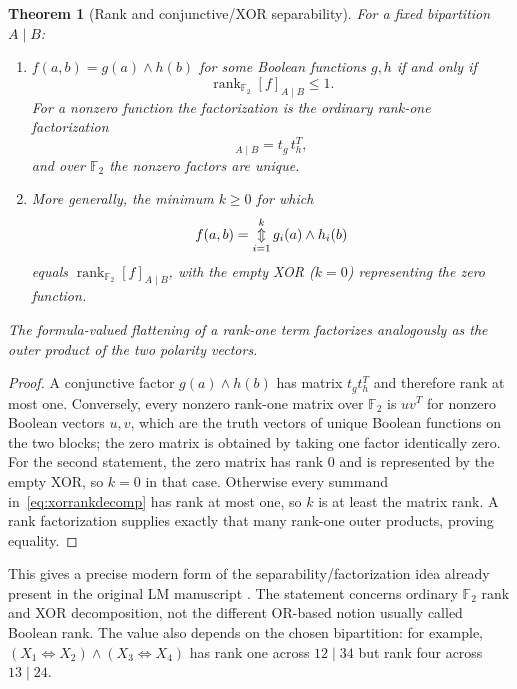 \documentclass[11pt]{article}
\newtheorem{theorem}{Theorem}[section]
\theoremstyle{definition}
\theoremstyle{remark}
\newcommand{\F}{\mathbb F}
\newcommand{\bigxor}{\mathop{\Updownarrow}\displaylimits}
\begin{document}
\begin{theorem}[Rank and conjunctive/XOR separability]
For a fixed bipartition $A\mid B$:
\begin{enumerate}
\item $f(a,b)=g(a)\land h(b)$ for some Boolean functions $g,h$ if and only if
\[
 \operatorname{rank}_{\F_2}[f]_{A\mid B}\le 1.
\]
For a nonzero function the factorization is the ordinary rank-one factorization
\begin{equation}
 [f]_{A\mid B}=t_g\,t_h^T,
 \label{eq:separable}
\end{equation}
and over $\F_2$ the nonzero factors are unique.
\item More generally, the minimum $k\ge0$ for which
\begin{equation}
 f(a,b)=\bigxor_{i=1}^{k} g_i(a)\land h_i(b)
 \label{eq:xorrankdecomp}
\end{equation}
equals $\operatorname{rank}_{\F_2}[f]_{A\mid B}$, with the empty XOR ($k=0$) representing the zero function.
\end{enumerate}
The formula-valued flattening of a rank-one term factorizes analogously as the outer product of the two polarity vectors.
\end{theorem}
\begin{proof}
A conjunctive factor $g(a)\land h(b)$ has matrix $t_g t_h^T$ and therefore rank at most one.  Conversely, every nonzero rank-one matrix over $\F_2$ is $uv^T$ for nonzero Boolean vectors $u,v$, which are the truth vectors of unique Boolean functions on the two blocks; the zero matrix is obtained by taking one factor identically zero.  For the second statement, the zero matrix has rank $0$ and is represented by the empty XOR, so $k=0$ in that case.  Otherwise every summand in~\eqref{eq:xorrankdecomp} has rank at most one, so $k$ is at least the matrix rank.  A rank factorization supplies exactly that many rank-one outer products, proving equality.
\end{proof}

This gives a precise modern form of the separability/factorization idea already present in the original LM manuscript \cite{Droncheff2018}.  The statement concerns ordinary $\F_2$ rank and XOR decomposition, not the different OR-based notion usually called Boolean rank.  The value also depends on the chosen bipartition: for example, $(X_1\Leftrightarrow X_2)\land(X_3\Leftrightarrow X_4)$ has rank one across $12\mid34$ but rank four across $13\mid24$.
\end{document}
